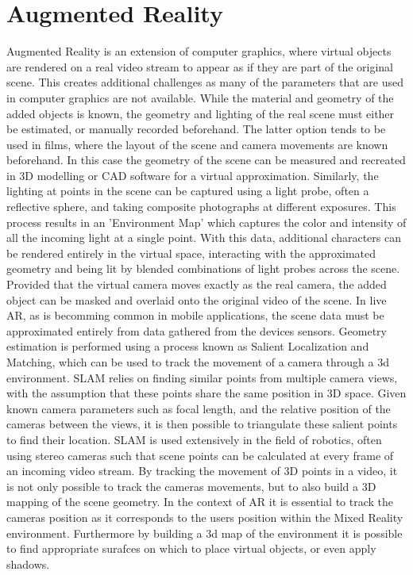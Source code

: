 \documentclass[ %
                    author={Gavin Parker},
                supervisor={Dr. Neill Campbell},
                    degree={MEng},
                     title={Deep Siamese Networks for Illumination Estimation from Stereo Images},
                  subtitle={},
                      type={research},
                      year={2018} ]{dissertation}
\begin{document}
\section{Augmented Reality}
Augmented Reality is an extension of computer graphics, where virtual objects are rendered on a real video stream to appear as if they are part of the original scene. This creates additional challenges as many of the parameters that are used in computer graphics are not available. While the material and geometry of the added objects is known, the geometry and lighting of the real scene must either be estimated, or manually recorded beforehand. The latter option tends to be used in films, where the layout of the scene and camera movements are known beforehand. In this case the geometry of the scene can be measured and recreated in 3D modelling or CAD software for a virtual approximation. Similarly, the lighting at points in the scene can be captured using a light probe, often a reflective sphere, and taking composite photographs at different exposures. This process results in an 'Environment Map' which captures the color and intensity of all the incoming light at a single point. With this data, additional characters can be rendered entirely in the virtual space, interacting with the approximated geometry and being lit by blended combinations of light probes across the scene. Provided that the virtual camera moves exactly as the real camera, the added object can be masked and overlaid onto the original video of the scene.
\newline
In live AR, as is becomming common in mobile applications, the scene data must be approximated entirely from data gathered from the devices sensors. Geometry estimation is performed using a process known as Salient Localization and Matching, which can be used to track the movement of a camera through a 3d environment. SLAM relies on finding similar points from multiple camera views, with the assumption that these points share the same position in 3D space. Given known camera parameters such as focal length, and the relative position of the cameras between the views, it is then possible to triangulate these salient points to find their location. SLAM is used extensively in the field of robotics, often using stereo cameras such that scene points can be calculated at every frame of an incoming video stream. By tracking the movement of 3D points in a video, it is not only possible to track the cameras movements, but to also build a 3D mapping of the scene geometry. In the context of AR it is essential to track the cameras position as it corresponds to the users position within the Mixed Reality environment. Furthermore by building a 3d map of the environment it is possible to find appropriate surafces on which to place virtual objects, or even apply shadows.
\end{document}
